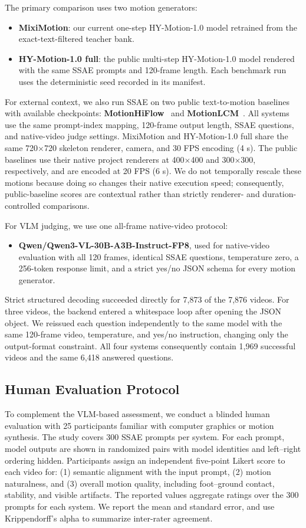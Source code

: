 \documentclass[runningheads]{llncs}
\begin{document}
The primary comparison uses two motion generators:
\begin{itemize}
\item \textbf{MixiMotion}: our current one-step HY-Motion-1.0 model retrained
from the exact-text-filtered teacher bank.
\item \textbf{HY-Motion-1.0 full}: the public multi-step HY-Motion-1.0 model
rendered with the same SSAE prompts and 120-frame length. Each benchmark run
uses the deterministic seed recorded in its manifest.
\end{itemize}
For external context, we also run SSAE on two public text-to-motion baselines
with available checkpoints: \textbf{MotionHiFlow}~\cite{motionhiflow2026} and
\textbf{MotionLCM}~\cite{motionlcm2024}. All systems use the same prompt-index
mapping, 120-frame output length, SSAE questions, and native-video judge
settings. MixiMotion and HY-Motion-1.0 full share the same 720$\times$720
skeleton renderer, camera, and 30 FPS encoding (4 s). The public baselines use
their native project renderers at 400$\times$400 and 300$\times$300,
respectively, and are encoded at 20 FPS (6 s). We do not temporally rescale
these motions because doing so changes their native execution speed;
consequently, public-baseline scores are contextual rather than strictly
renderer- and duration-controlled comparisons.

For VLM judging, we use one all-frame native-video protocol:
\begin{itemize}
\item \textbf{Qwen/Qwen3-VL-30B-A3B-Instruct-FP8}, used for native-video
evaluation with all 120 frames, identical SSAE questions, temperature zero,
a 256-token response limit, and a strict yes/no JSON schema for every motion
generator.
\end{itemize}
Strict structured decoding succeeded directly for 7,873 of the 7,876 videos.
For three videos, the backend entered a whitespace loop after opening the JSON
object. We reissued each question independently to the same model with the
same 120-frame video, temperature, and yes/no instruction, changing only the
output-format constraint. All four systems consequently contain 1,969
successful videos and the same 6,418 answered questions.

\subsection{Human Evaluation Protocol}

To complement the VLM-based assessment, we conduct a blinded human evaluation
with 25 participants familiar with computer graphics or motion synthesis. The
study covers 300 SSAE prompts per system. For each prompt, model outputs are
shown in randomized pairs with model identities and left--right ordering
hidden. Participants assign an independent five-point Likert score to each
video for: (1) semantic alignment with the input prompt, (2) motion
naturalness, and (3) overall motion quality, including foot--ground contact,
stability, and visible artifacts. The reported values aggregate ratings over
the 300 prompts for each system. We report the mean and standard error, and use
Krippendorff's alpha to summarize inter-rater agreement.
\end{document}
